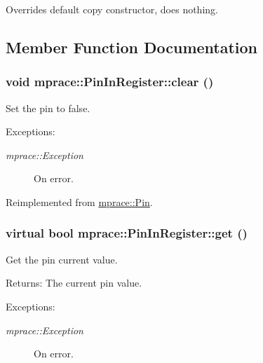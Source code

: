 Overrides default copy constructor, does nothing. 



\subsection{Member Function Documentation}
\hypertarget{classmprace_1_1PinInRegister_a5}{
\subsubsection[clear]{\setlength{\rightskip}{0pt plus 5cm}void mprace::Pin\-In\-Register::clear ()}}
\label{classmprace_1_1PinInRegister_a5}


Set the pin to false. 

\begin{Desc}
\item[Exceptions:]
\begin{description}
\item[{\em mprace::Exception}]On error.\end{description}
\end{Desc}


Reimplemented from \hyperlink{classmprace_1_1Pin_a4}{mprace::Pin}.\hypertarget{classmprace_1_1PinInRegister_a3}{
\subsubsection[get]{\setlength{\rightskip}{0pt plus 5cm}virtual bool mprace::Pin\-In\-Register::get ()}}
\label{classmprace_1_1PinInRegister_a3}


Get the pin current value. 

\begin{Desc}
\item[Returns:]The current pin value. \end{Desc}
\begin{Desc}
\item[Exceptions:]
\begin{description}
\item[{\em mprace::Exception}]On error.\end{description}
\end{Desc}



